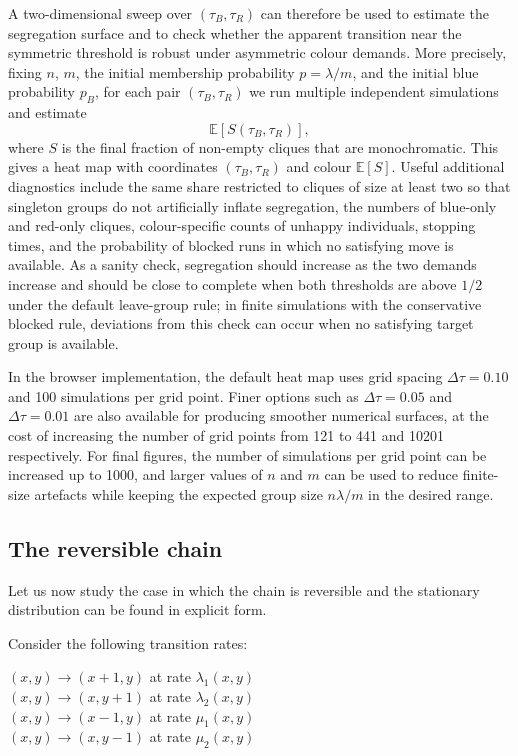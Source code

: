 \documentclass{article}
\theoremstyle{remark}
\newtheorem*{partial proof}{Partial proof of the Conjecture}
\begin{document}
A two-dimensional sweep over $(\tau_B,\tau_R)$ can therefore be used to estimate the segregation surface and to check whether the apparent transition near the symmetric threshold is robust under asymmetric colour demands. More precisely, fixing $n$, $m$, the initial membership probability $p=\lambda/m$, and the initial blue probability $p_B$, for each pair $(\tau_B,\tau_R)$ we run multiple independent simulations and estimate
$$
    \mathbb{E}[S(\tau_B,\tau_R)],
$$
where $S$ is the final fraction of non-empty cliques that are monochromatic. This gives a heat map with coordinates $(\tau_B,\tau_R)$ and colour $\mathbb{E}[S]$. Useful additional diagnostics include the same share restricted to cliques of size at least two so that singleton groups do not artificially inflate segregation, the numbers of blue-only and red-only cliques, colour-specific counts of unhappy individuals, stopping times, and the probability of blocked runs in which no satisfying move is available. As a sanity check, segregation should increase as the two demands increase and should be close to complete when both thresholds are above $1/2$ under the default leave-group rule; in finite simulations with the conservative blocked rule, deviations from this check can occur when no satisfying target group is available.

In the browser implementation, the default heat map uses grid spacing $\Delta\tau=0.10$ and 100 simulations per grid point. Finer options such as $\Delta\tau=0.05$ and $\Delta\tau=0.01$ are also available for producing smoother numerical surfaces, at the cost of increasing the number of grid points from 121 to 441 and 10201 respectively. For final figures, the number of simulations per grid point can be increased up to 1000, and larger values of $n$ and $m$ can be used to reduce finite-size artefacts while keeping the expected group size $n\lambda/m$ in the desired range.


\subsection{The reversible chain}

Let us now study the case in which the chain is reversible and the stationary distribution can be found in explicit form.

Consider the following transition rates:
 \begin{center}
        $(x,y) \to (x+1,y)$ at rate $\lambda_1(x,y)$\\
        $(x,y) \to (x,y+1)$ at rate $\lambda_2(x,y)$\\
        $(x,y) \to (x-1,y)$ at rate $\mu_1(x,y)$\\
        $(x,y) \to (x,y-1)$ at rate $\mu_2(x,y)$
    \end{center}
\end{document}
